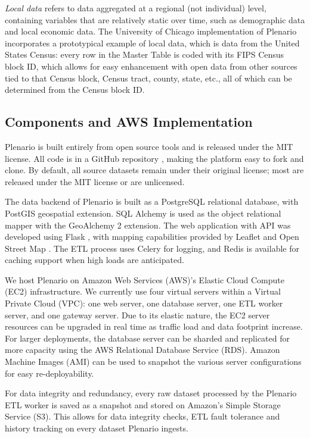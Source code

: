 \documentclass[11pt]{article}
\begin{document}
\textit{Local data} refers to data aggregated at a regional (not individual) level, containing variables that are relatively static over time, such as demographic data and local economic data. The University of Chicago implementation of Plenario incorporates a prototypical example of local data, which is data from the United States Census: every row in the Master Table is coded with its FIPS Census block ID, which allows for easy enhancement with open data from other sources tied to that Census block, Census tract, county, state, etc., all of which can be determined from the Census block ID. 

\subsection{Components and AWS Implementation}
Plenario is built entirely from open source tools and is released under the MIT license. All code is in a GitHub repository \cite{plenario-github}, making the platform easy to fork and clone. By default, all source datasets remain under their original license; most are released under the MIT license or are unlicensed. 

The data backend of Plenario is built as a PostgreSQL relational database, with PostGIS geospatial extension. SQL Alchemy \cite{sqlalchemy} is used as the object relational mapper with the GeoAlchemy 2 extension. The web application with API was developed using Flask \cite{flask}, with mapping capabilities provided by Leaflet \cite{leaflet} and Open Street Map \cite{openstreetmap}. The ETL process uses Celery \cite{celery} for logging, and Redis \cite{redis} is available for caching support when high loads are anticipated. 

We host Plenario on Amazon Web Services (AWS)'s Elastic Cloud Compute (EC2) infrastructure. We currently use four virtual servers within a Virtual Private Cloud (VPC): one web server, one database server, one ETL worker server, and one gateway server. Due to its elastic nature, the EC2 server resources can be upgraded in real time as traffic load and data footprint increase. For larger deployments, the database server can be sharded and replicated for more capacity using the AWS Relational Database Service (RDS). Amazon Machine Images (AMI) can be used to snapshot the various server configurations for easy re-deployability.

For data integrity and redundancy, every raw dataset processed by the Plenario ETL worker is saved as a snapshot and stored on Amazon's Simple Storage Service (S3). This allows for data integrity checks, ETL fault tolerance and history tracking on every dataset Plenario ingests.
\end{document}
